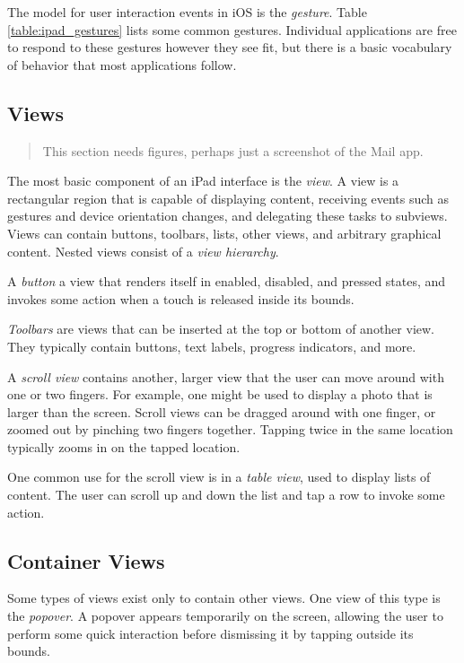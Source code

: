 The model for user interaction events in iOS is the \emph{gesture}. Table
\ref{table:ipad_gestures} lists some common gestures. Individual applications
are free to respond to these gestures however they see fit, but there is a basic
vocabulary of behavior that most applications follow.

\subsection{Views}
\label{sect:ipad_views}

\begin{quote}
    This section needs figures, perhaps just a screenshot of the Mail app.
\end{quote}

The most basic component of an iPad interface is the \emph{view}. A view is a
rectangular region that is capable of displaying content, receiving events such
as gestures and device orientation changes, and delegating these tasks to
subviews. Views can contain buttons, toolbars, lists, other views, and arbitrary
graphical content. Nested views consist of a \emph{view hierarchy}.

A \emph{button} a view that renders itself in enabled, disabled, and pressed
states, and invokes some action when a touch is released inside its bounds.

\emph{Toolbars} are views that can be inserted at the top or bottom of another
view. They typically contain buttons, text labels, progress indicators, and
more.

A \emph{scroll view} contains another, larger view that the user can move
around with one or two fingers. For example, one might be used to display a
photo that is larger than the screen. Scroll views can be dragged around with
one finger, or zoomed out by pinching two fingers together. Tapping twice in the
same location typically zooms in on the tapped location.

One common use for the scroll view is in a \emph{table view}, used to display
lists of content. The user can scroll up and down the list and tap a row to
invoke some action.

\subsection{Container Views}
\label{sect:ipad_container_views}

Some types of views exist only to contain other views. One view of this type is
the \emph{popover}. A popover appears temporarily on the screen, allowing the
user to perform some quick interaction before dismissing it by tapping outside
its bounds.

